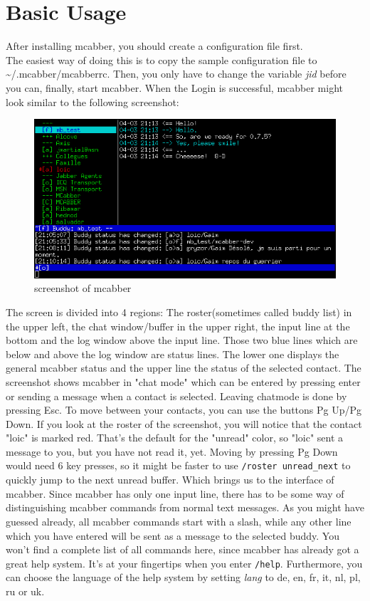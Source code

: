 \documentclass[12pt,oneside,a4]{book}
\begin{document}
\chapter{Basic Usage}
After installing mcabber, you should create a configuration file first.\\
The easiest way of doing this is to copy the sample configuration file\cite{samplerc} to
\~{}/.mcabber/mcabberrc. Then, you only have to change the variable
\textit{jid} before you can, finally, start mcabber. When the Login is
successful, mcabber might look similar to the following screenshot:\\
\begin{figure}[h!]
	\centering
	\includegraphics[scale=0.8]{guide}
	\caption{screenshot of mcabber}
	\label{fig:screenshot}
\end{figure}
The screen is divided into 4 regions: The roster(sometimes called buddy list) in the upper left,
the chat window/buffer in the upper right, the input line at the bottom and the log window above the
input line. Those two blue lines which are below and above the log window are status lines. The lower one
displays the general mcabber status and the upper line the status of the selected contact.
The screenshot shows mcabber in "chat mode" which can be entered by pressing enter or sending a message
when a contact is selected. Leaving chatmode is done by pressing Esc. To move between your contacts, you
can use the buttons Pg Up/Pg Down. If you look at the roster of the screenshot, you will notice that the
contact "loic" is marked red. That's the default for the "unread" color, so "loic" sent a message to
you, but you have not read it, yet. Moving by pressing Pg Down would need 6 key presses, so it might be faster to use
\verb+/roster unread_next+ to quickly jump to the next unread buffer. Which brings us to the interface of mcabber.
Since mcabber has only one input line, there has to be some way of distinguishing mcabber commands from normal text
messages. As you might have guessed already, all mcabber commands start with a slash, while any other line which you
have entered will be sent as a message to the selected buddy. You won't find a complete list of all commands here,
since mcabber has already got a great help system. It's at your fingertips when you enter \verb+/help+.
Furthermore, you can choose the language of the help system by setting \textit{lang} to de, en, fr, it, nl, pl, ru or uk.
\end{document}

